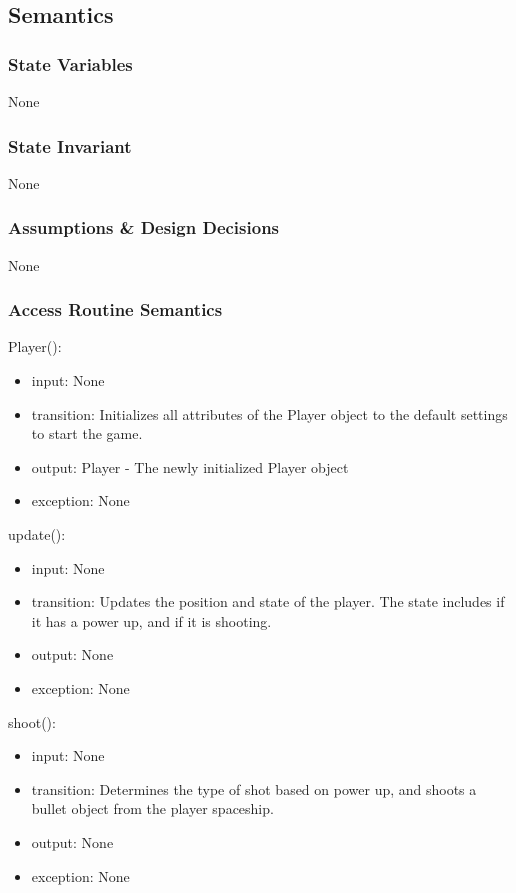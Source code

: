\documentclass[12pt, titlepage]{article}
\begin{document}
\subsection* {Semantics}

\subsubsection* {State Variables}

None

\subsubsection* {State Invariant}

None

\subsubsection* {Assumptions \& Design Decisions}

None

\subsubsection* {Access Routine Semantics}

\noindent Player():
\begin{itemize}
\item input: None
\item transition: Initializes all attributes of the Player object to the default settings to start the game.
\item output: Player - The newly initialized Player object
\item exception: None
\end{itemize}

\noindent update():
\begin{itemize}
\item input: None
\item transition: Updates the position and state of the player. The state includes if it has a power up, and if it is shooting. 
\item output: None
\item exception: None
\end{itemize}

\noindent shoot():
\begin{itemize}
\item input: None
\item transition: Determines the type of shot based on power up, and shoots a bullet object from the player spaceship.  
\item output: None
\item exception: None
\end{itemize}
\end{document}
